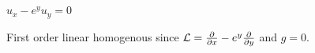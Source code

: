 $u_x - e^yu_y = 0$

\soln* First order linear homogenous since $\mathcal{L} = \pdv{x} - e^y\pdv{y}$ and $g = 0$.